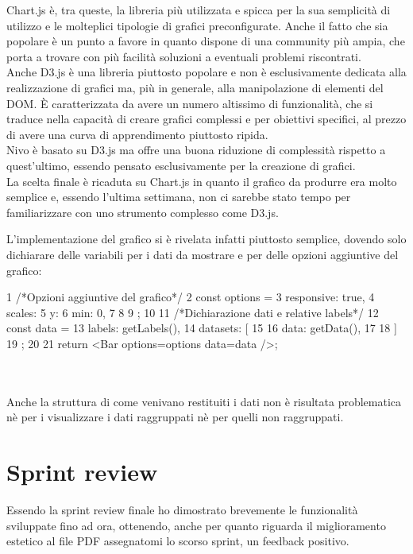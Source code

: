 \noindent Chart.js è, tra queste, la libreria più utilizzata e spicca per la sua semplicità di utilizzo e le molteplici tipologie di grafici preconfigurate. Anche il fatto che sia popolare è un punto a favore in quanto dispone di una community più ampia, che porta a trovare con più facilità soluzioni a eventuali problemi riscontrati.\\
Anche D3.js è una libreria piuttosto popolare e non è esclusivamente dedicata alla realizzazione di grafici ma, più in generale, alla manipolazione di elementi del DOM. È caratterizzata da avere un numero altissimo di funzionalità, che si traduce nella capacità di creare grafici complessi e per obiettivi specifici, al prezzo di avere una curva di apprendimento piuttosto ripida.\\
Nivo è basato su D3.js ma offre una buona riduzione di complessità rispetto a quest'ultimo, essendo pensato esclusivamente per la creazione di grafici.\\

La scelta finale è ricaduta su Chart.js in quanto il grafico da produrre era molto semplice e, essendo l'ultima settimana, non ci sarebbe stato tempo per familiarizzare con uno strumento complesso come D3.js.

L'implementazione del grafico si è rivelata infatti piuttosto semplice, dovendo solo dichiarare delle variabili per i dati da mostrare e per delle opzioni aggiuntive del grafico:

\begin{code}[frame=tb,title={Esempio di utilizzo di Chart.js}]
1   /*Opzioni aggiuntive del grafico*/
2   const options = {
3     responsive: true,
4     scales: {
5       y: {
6         min: 0,
7       }
8     }
9   };
10
11  /*Dichiarazione dati e relative labels*/
12  const data = {
13    labels: getLabels(),
14    datasets: [
15      {
16        data: getData(),
17      }
18    ]
19  };
20
21  return <Bar options={options} data={data} />;
\end{code}\\\\

\noindent Anche la struttura di come venivano restituiti i dati non è risultata problematica nè per i visualizzare i dati raggruppati nè per quelli non raggruppati.

\section{Sprint review}
Essendo la sprint review finale ho dimostrato brevemente le funzionalità sviluppate fino ad ora, ottenendo, anche per quanto riguarda il miglioramento estetico al file PDF assegnatomi lo scorso sprint, un feedback positivo. 